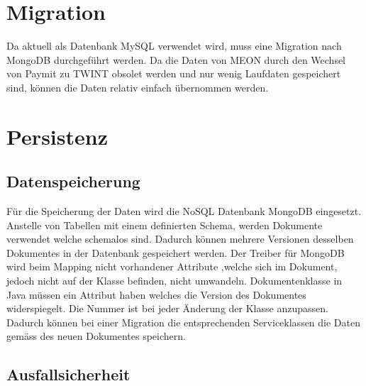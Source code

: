 \section{Migration}

Da aktuell als Datenbank MySQL verwendet wird, muss eine Migration nach MongoDB durchgeführt werden. Da die Daten von MEON durch den Wechsel von Paymit zu TWINT
obsolet werden und nur wenig Laufdaten gespeichert sind, können die Daten relativ einfach übernommen werden.

\section{Persistenz}
\label{persistenz}

\subsection{Datenspeicherung}
Für die Speicherung der Daten wird die NoSQL Datenbank MongoDB eingesetzt. Anstelle von Tabellen mit einem definierten Schema, werden Dokumente verwendet welche schemalos sind. Dadurch können mehrere Versionen desselben Dokumentes in der Datenbank gespeichert werden. Der Treiber für MongoDB wird beim Mapping nicht vorhandener Attribute ,welche sich im Dokument, jedoch nicht auf der Klasse befinden, nicht umwandeln.\newline
Dokumentenklasse in Java müssen ein Attribut haben welches die Version des Dokumentes widerspiegelt. Die Nummer ist bei jeder Änderung der Klasse anzupassen. Dadurch können bei einer Migration die entsprechenden Serviceklassen die Daten gemäss des neuen Dokumentes speichern.

\subsection{Ausfallsicherheit}

